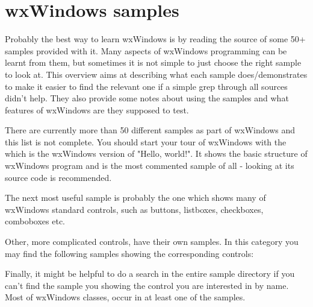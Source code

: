 
\section{wxWindows samples}\label{samples}

Probably the best way to learn wxWindows is by reading the source of some 50+
samples provided with it. Many aspects of wxWindows programming can be learnt
from them, but sometimes it is not simple to just choose the right sample to
look at. This overview aims at describing what each sample does/demonstrates to
make it easier to find the relevant one if a simple grep through all sources
didn't help. They also provide some notes about using the samples and what
features of wxWindows are they supposed to test.

There are currently more than 50 different samples as part of wxWindows and
this list is not complete. You should start your tour of wxWindows with the 
 which is the wxWindows version of
"Hello, world!". It shows the basic structure of wxWindows program and is the
most commented sample of all - looking at its source code is recommended.

The next most useful sample is probably the  
one which shows many of wxWindows standard controls, such as buttons,
listboxes, checkboxes, comboboxes etc.

Other, more complicated controls, have their own samples. In this category you
may find the following samples showing the corresponding controls:

\begin{twocollist}\itemsep=0pt
\end{twocollist}

Finally, it might be helpful to do a search in the entire sample directory if
you can't find the sample you showing the control you are interested in by
name. Most of wxWindows classes, occur in at least one of the samples.

